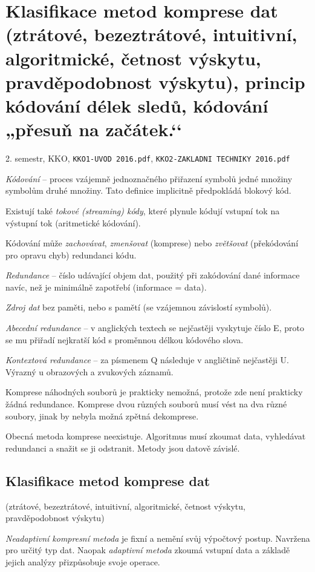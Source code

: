\documentclass[a4paper, 11pt]{report}
\begin{document}
\chapter{Klasifikace metod komprese dat (ztrátové, bezeztrátové, intuitivní, algoritmické, četnost výskytu, pravděpodobnost výskytu), princip kódování délek sledů, kódování „přesuň na začátek.‘‘} \label{cha:34}
2. semestr, KKO, \texttt{KKO1-UVOD 2016.pdf}, \texttt{KKO2-ZAKLADNI TECHNIKY 2016.pdf}

\emph{Kódování} -- proces vzájemně jednoznačného přiřazení symbolů jedné množiny symbolům druhé množiny. Tato definice implicitně předpokládá blokový kód.

Existují také \emph{tokové (streaming) kódy}, které plynule kódují vstupní tok na výstupní tok (aritmetické kódování).

Kódování může \emph{zachovávat}, \emph{zmenšovat} (komprese) nebo \emph{zvětšovat} (překódování pro opravu chyb) redundanci kódu.

\emph{Redundance} -- číslo udávající objem dat, použitý při zakódování dané informace navíc, než je minimálně zapotřebí (informace = data).

\emph{Zdroj dat} bez paměti, nebo s pamětí (se vzájemnou závislostí symbolů).

\emph{Abecední redundance} -- v anglických textech se nejčastěji vyskytuje číslo E, proto se mu přiřadí nejkratší kód s proměnnou délkou kódového slova.

\emph{Kontextová redundance} -- za písmenem Q následuje v angličtině nejčastěji U. Výrazný u obrazových a zvukových záznamů.

Komprese náhodných souborů je prakticky nemožná, protože zde není prakticky žádná redundance. Komprese dvou různých souborů musí vést na dva různé soubory, jinak by nebyla možná zpětná dekomprese.

Obecná metoda komprese neexistuje. Algoritmus musí zkoumat data, vyhledávat redundanci a snažit se ji odstranit. Metody jsou datově závislé.

\section{Klasifikace metod komprese dat}
(ztrátové, bezeztrátové, intuitivní, algoritmické, četnost výskytu, pravděpodobnost výskytu)

\emph{Neadaptivní kompresní metoda} je fixní a nemění svůj výpočtový postup. Navržena pro určitý typ dat. Naopak \emph{adaptivní metoda} zkoumá vstupní data a základě jejich analýzy přizpůsobuje svoje operace.
\end{document}
